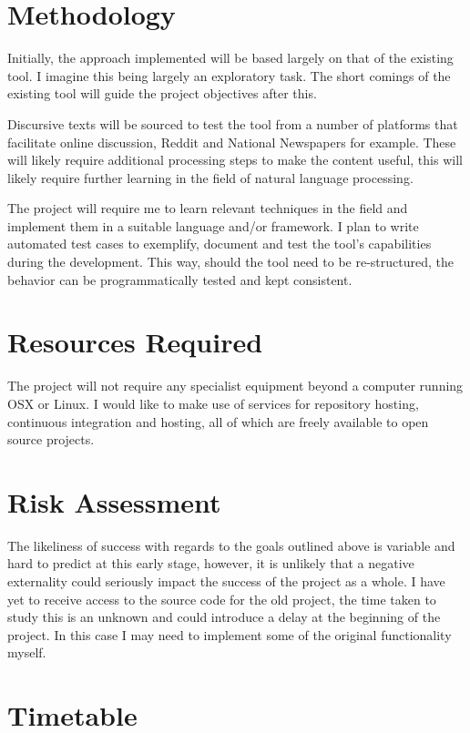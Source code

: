\documentclass[tikz]{article}
\begin{document}
  \section{Methodology}
      Initially, the approach implemented will be based largely on that of the existing tool. I imagine this being largely an exploratory task. The short comings of the existing tool will guide the project objectives after this.

      Discursive texts will be sourced to test the tool from a number of platforms that facilitate online discussion, Reddit and National Newspapers for example. These will likely require additional processing steps to make the content useful, this will likely require further learning in the field of natural language processing.

      The project will require me to learn relevant techniques in the field and implement them in a suitable language and/or framework. I plan to write automated test cases to exemplify, document and test the tool's capabilities during the development. This way, should the tool need to be re-structured, the behavior can be programmatically tested and kept consistent.

  \section{Resources Required}
    The project will not require any specialist equipment beyond a computer running OSX or Linux. I would like to make use of services for repository hosting, continuous integration and hosting, all of which are freely available to open source projects.

  \section{Risk Assessment}
    The likeliness of success with regards to the goals outlined above is variable and hard to predict at this early stage, however, it is unlikely that a negative externality could seriously impact the success of the project as a whole. I have yet to receive access to the source code for the old project, the time taken to study this is an unknown and could introduce a delay at the beginning of the project. In this case I may need to implement some of the original functionality myself.

  \section{Timetable}
\end{document}

